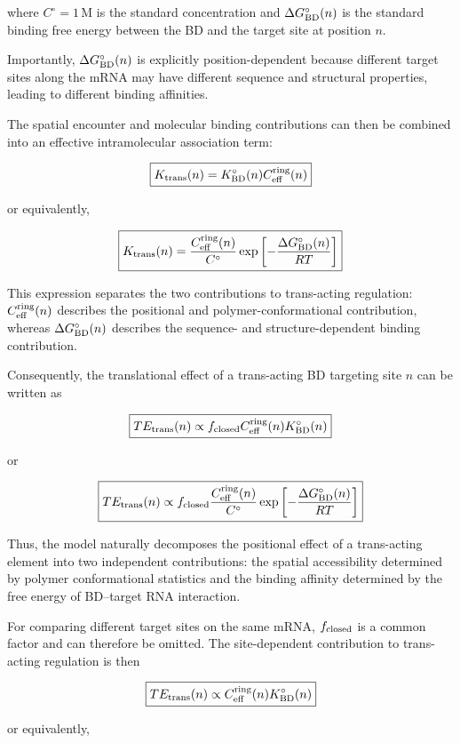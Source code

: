 \documentclass{article}
\begin{document}
where \(C^\circ=1\,\mathrm{M}\) is the standard concentration and
\(\Delta G_{\rm BD}^{\circ}(n)\) is the standard binding free energy between the BD and the target site at position \(n\).

Importantly, \(\Delta G_{\rm BD}^{\circ}(n)\) is explicitly position-dependent because different target sites along the mRNA may have different sequence and structural properties, leading to different binding affinities.

The spatial encounter and molecular binding contributions can then be combined into an effective intramolecular association term:

\[
\boxed{
K_{\rm trans}(n)
=
K_{\rm BD}^{\circ}(n)
C_{\rm eff}^{\rm ring}(n)
}
\]

or equivalently,

\[
\boxed{
K_{\rm trans}(n)
=
\frac{
C_{\rm eff}^{\rm ring}(n)
}{
C^\circ
}
\exp\left[
-\frac{\Delta G_{\rm BD}^{\circ}(n)}
{RT}
\right]
}
\]

This expression separates the two contributions to trans-acting regulation: \(C_{\rm eff}^{\rm ring}(n)\) describes the positional and polymer-conformational contribution, whereas \(\Delta G_{\rm BD}^{\circ}(n)\) describes the sequence- and structure-dependent binding contribution.

Consequently, the translational effect of a trans-acting BD targeting site \(n\) can be written as

\[
\boxed{
TE_{\rm trans}(n)
\propto
f_{\rm closed}
C_{\rm eff}^{\rm ring}(n)
K_{\rm BD}^{\circ}(n)
}
\]

or

\[
\boxed{
TE_{\rm trans}(n)
\propto
f_{\rm closed}
\frac{
C_{\rm eff}^{\rm ring}(n)
}{
C^\circ
}
\exp\left[
-\frac{\Delta G_{\rm BD}^{\circ}(n)}
{RT}
\right]
}
\]

Thus, the model naturally decomposes the positional effect of a trans-acting element into two independent contributions: the spatial accessibility determined by polymer conformational statistics and the binding affinity determined by the free energy of BD--target RNA interaction.

For comparing different target sites on the same mRNA, \(f_{\rm closed}\) is a common factor and can therefore be omitted. The site-dependent contribution to trans-acting regulation is then

\[
\boxed{
TE_{\rm trans}(n)
\propto
C_{\rm eff}^{\rm ring}(n)
K_{\rm BD}^{\circ}(n)
}
\]

or equivalently,
\end{document}
